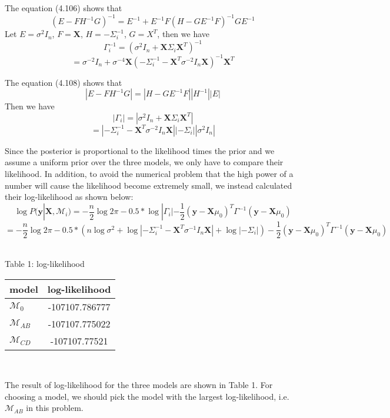 \documentclass{article}
\begin{document}
\noindent
The equation (4.106) shows that\\
$$(E - FH^{-1}G)^{-1} = E^{-1} + E^{-1}F(H - GE^{-1}F)^{-1}GE^{-1}$$
Let $E = \sigma^2I_n$, $F = \textbf{X}$, $H = -\Sigma_i^{-1}$, $G = X^T$, then we have
$$\Gamma_i^{-1} = (\sigma^2I_n + \textbf{X}\Sigma_i\textbf{X}^T)^{-1}$$
$$= \sigma^{-2}I_n + \sigma^{-4}\textbf{X}(-\Sigma_i^{-1} - \textbf{X}^T\sigma^{-2}I_n\textbf{X})^{-1}\textbf{X}^T$$

\noindent
The equation (4.108) shows that\\
$$|E - FH^{-1}G| = |H - GE^{-1}F||H^{-1}||E|$$
Then we have
$$|\Gamma_i| = |\sigma^2I_n + \textbf{X}\Sigma_i\textbf{X}^T|$$
$$=|-\Sigma_i^{-1} - \textbf{X}^T\sigma^{-2}I_n\textbf{X}||-\Sigma_i||\sigma^2I_n|$$

\noindent
Since the posterior is proportional to the likelihood times the prior and we assume a uniform prior over the three models, we only have to compare their likelihood. In addition, to avoid the numerical problem that the high power of a number will cause the likelihood become extremely small, we instead calculated their log-likelihood as shown below:\\
$$\log P(\textbf{y}|\textbf{X}, \mathcal{M}_i) = -\frac{n}{2} \log2\pi - 0.5 * \log|\Gamma_i| - \frac{1}{2}(\textbf{y} - \textbf{X}\mu_0)^T \Gamma^{-1} (\textbf{y} - \textbf{X}\mu_0)$$
$$=-\frac{n}{2} \log2\pi - 0.5 * (n\log\sigma^2 + \log|-\Sigma_i^{-1} - \textbf{X}^T\sigma^{-1}I_n\textbf{X}| + \log|-\Sigma_i|) - \frac{1}{2}(\textbf{y} - \textbf{X}\mu_0)^T \Gamma^{-1} (\textbf{y} - \textbf{X}\mu_0)$$\\

\noindent
\begin{center}
Table 1: log-likelihood\\
\begin{tabular}{ l c }
  model & log-likelihood \\
  \hline
  $\mathcal{M}_0$    & -107107.786777  \\
  $\mathcal{M}_{AB}$ & -107107.775022  \\
  $\mathcal{M}_{CD}$ & -107107.77521
\end{tabular}\\
\end{center}

\noindent
The result of log-likelihood for the three models are shown in Table 1. For choosing a model, we should pick the model with the largest log-likelihood, i.e. $\mathcal{M}_{AB}$ in this problem.\\
\end{document}
